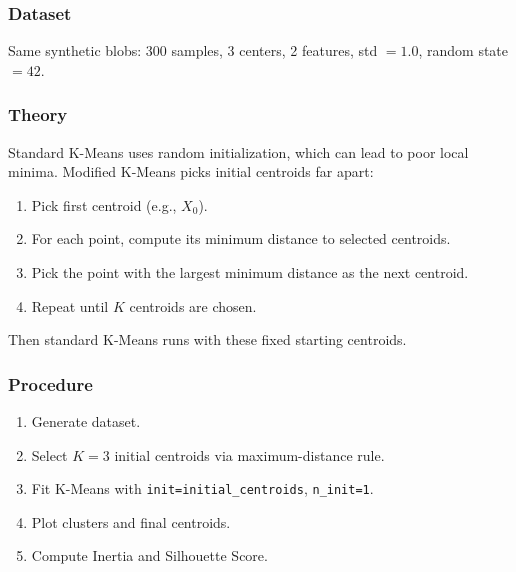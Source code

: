 \documentclass[a4paper,10pt]{article}
\begin{document}
\subsubsection{Dataset}
Same synthetic blobs: 300 samples, 3 centers, 2 features, std \(=1.0\), random state \(=42\).

\subsubsection{Theory}
Standard K-Means uses random initialization, which can lead to poor local minima. Modified K-Means picks initial centroids far apart:
\begin{enumerate}[nosep]
    \item Pick first centroid (e.g., \(X_0\)).
    \item For each point, compute its minimum distance to selected centroids.
    \item Pick the point with the largest minimum distance as the next centroid.
    \item Repeat until \(K\) centroids are chosen.
\end{enumerate}
Then standard K-Means runs with these fixed starting centroids.

\subsubsection{Procedure}
\begin{enumerate}[nosep]
    \item Generate dataset.
    \item Select \(K=3\) initial centroids via maximum-distance rule.
    \item Fit K-Means with \texttt{init=initial\_centroids}, \texttt{n\_init=1}.
    \item Plot clusters and final centroids.
    \item Compute Inertia and Silhouette Score.
\end{enumerate}
\end{document}
